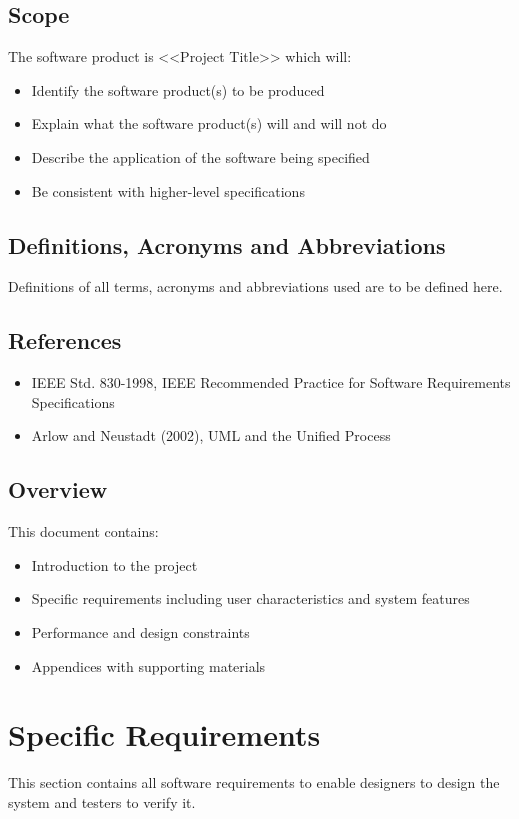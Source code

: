 \documentclass[oneside]{utmsrs}
\begin{document}
\section{Scope}
The software product is <<Project Title>> which will:
\begin{itemize}
    \item Identify the software product(s) to be produced
    \item Explain what the software product(s) will and will not do
    \item Describe the application of the software being specified
    \item Be consistent with higher-level specifications
\end{itemize}

\section{Definitions, Acronyms and Abbreviations}
Definitions of all terms, acronyms and abbreviations used are to be defined here.

\section{References}
\begin{itemize}
    \item IEEE Std. 830-1998, IEEE Recommended Practice for Software Requirements Specifications
    \item Arlow and Neustadt (2002), UML and the Unified Process
\end{itemize}

\section{Overview}
This document contains:
\begin{itemize}
    \item Introduction to the project
    \item Specific requirements including user characteristics and system features
    \item Performance and design constraints
    \item Appendices with supporting materials
\end{itemize}

\chapter{Specific Requirements}
This section contains all software requirements to enable designers to design the system and testers to verify it.
\end{document}
